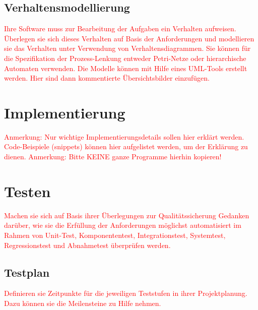 \documentclass[a4paper, 11pt]{article}
\begin{document}
\subsection{Verhaltensmodellierung}
\textcolor{red}{Ihre Software muss zur Bearbeitung der Aufgaben ein Verhalten aufweisen. Überlegen sie sich dieses Verhalten auf Basis der Anforderungen und modellieren sie das Verhalten unter Verwendung von Verhaltensdiagrammen. Sie können für die Spezifikation der Prozess-Lenkung entweder Petri-Netze oder hierarchische Automaten verwenden. Die Modelle können mit Hilfe eines UML-Tools erstellt werden. Hier sind dann kommentierte Übersichtsbilder einzufügen.}

\section{Implementierung}
\textcolor{red}{Anmerkung: Nur wichtige Implementierungsdetails sollen hier erklärt werden. Code-Beispiele (snippets) können hier aufgelistet werden, um der Erklärung zu dienen. 
Anmerkung: Bitte KEINE ganze Programme hierhin kopieren!
}

\section{Testen}
\textcolor{red}{Machen sie sich auf Basis ihrer Überlegungen zur Qualitätssicherung Gedanken darüber, wie sie die Erfüllung der Anforderungen möglichst automatisiert im Rahmen von Unit-Test, Komponententest, Integrationstest, Systemtest, Regressionstest und Abnahmetest überprüfen werden.}

\subsection{Testplan}
\textcolor{red}{Definieren sie Zeitpunkte für die jeweiligen Teststufen in ihrer Projektplanung. Dazu können sie die Meilensteine zu Hilfe nehmen.}
\end{document}
